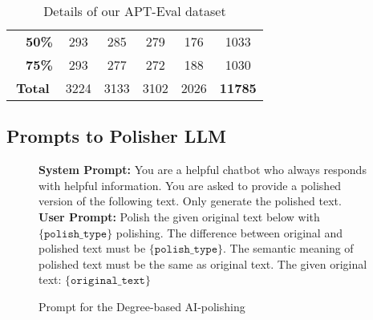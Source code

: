 \begin{table*}[htbp]
{\begin{tabular}{ll|cccc|c}
\multicolumn{1}{l|}{}                                           & \textbf{50\%}                 & 293  & 285  & 279  & 176  & 1033           \\
\multicolumn{1}{l|}{}                                           & \textbf{75\%}                 & 293  & 277  & 272  & 188  & 1030           \\ \hline
\multicolumn{2}{c|}{\textbf{Total}}                                                             & 3224 & 3133 & 3102 & 2026 & \textbf{11785}
\end{tabular}%
}
\caption{Details of our APT-Eval dataset}
\label{tab:apt_eval_details}
\end{table*}


\begin{table}[htbp]
    \centering
    \caption{Details on our `no-polish-HWT' set of our Dataset.}
    \label{tab:dataset_hwt_basic}
\end{table}


\subsection{Prompts to Polisher LLM}\label{app:llm_prompt}

\begin{figure}[htbp]
    \centering
    \begin{mybox}
    \textbf{System Prompt: } You are a helpful chatbot who always responds with helpful information. You are asked to provide a polished version of the following text. Only generate the polished text.\\
    \textbf{User Prompt: } Polish the given original text below with $\texttt{\{polish\_type\}}$ polishing. The difference between original and polished text must be $\texttt{\{polish\_type\}}$. The semantic meaning of polished text must be the same as original text. The given original text: $\texttt{\{original\_text\}}$
    \end{mybox}
    \caption{Prompt for the Degree-based AI-polishing}
    \label{fig:prompt_gpt_degree_polish}
\end{figure}


